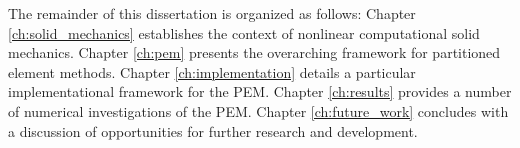 	The remainder of this dissertation is organized as follows: Chapter \ref{ch:solid_mechanics} establishes the context of nonlinear computational solid mechanics. Chapter \ref{ch:pem} presents the overarching framework for partitioned element methods. Chapter \ref{ch:implementation} details a particular implementational framework for the PEM. Chapter \ref{ch:results} provides a number of numerical investigations of the PEM. Chapter \ref{ch:future_work} concludes with a discussion of opportunities for further research and development.